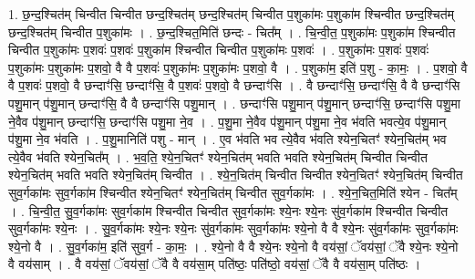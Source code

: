\documentclass[17pt]{extarticle}
\begin{document}
1. छ॒न्द॒श्चित॑म् चिन्वीत चिन्वीत छन्द॒श्चित॑म् छन्द॒श्चित॑म् चिन्वीत प॒शुका॑मः प॒शुका॑म श्चिन्वीत छन्द॒श्चित॑म् छन्द॒श्चित॑म् चिन्वीत प॒शुका॑मः । . छ॒न्द॒श्चित॒मिति॑ छन्दः - चित᳚म् । . चि॒न्वी॒त॒ प॒शुका॑मः प॒शुका॑म श्चिन्वीत चिन्वीत प॒शुका॑मः प॒शवः॑ प॒शवः॑ प॒शुका॑म श्चिन्वीत चिन्वीत प॒शुका॑मः प॒शवः॑ । . प॒शुका॑मः प॒शवः॑ प॒शवः॑ प॒शुका॑मः प॒शुका॑मः प॒शवो॒ वै वै प॒शवः॑ प॒शुका॑मः प॒शुका॑मः प॒शवो॒ वै । . प॒शुका॑म॒ इति॑ प॒शु - का॒मः॒ । . प॒शवो॒ वै वै प॒शवः॑ प॒शवो॒ वै छन्दाꣳ॑सि॒ छन्दाꣳ॑सि॒ वै प॒शवः॑ प॒शवो॒ वै छन्दाꣳ॑सि । . वै छन्दाꣳ॑सि॒ छन्दाꣳ॑सि॒ वै वै छन्दाꣳ॑सि पशु॒मान् प॑शु॒मान् छन्दाꣳ॑सि॒ वै वै छन्दाꣳ॑सि पशु॒मान् । . छन्दाꣳ॑सि पशु॒मान् प॑शु॒मान् छन्दाꣳ॑सि॒ छन्दाꣳ॑सि पशु॒मा ने॒वैव प॑शु॒मान् छन्दाꣳ॑सि॒ छन्दाꣳ॑सि पशु॒मा ने॒व । . प॒शु॒मा ने॒वैव प॑शु॒मान् प॑शु॒मा ने॒व भ॑वति भवत्ये॒व प॑शु॒मान् प॑शु॒मा ने॒व भ॑वति । . प॒शु॒मानिति॑ पशु - मान् । . ए॒व भ॑वति भव त्ये॒वैव भ॑वति श्येन॒चितꣳ॑ श्येन॒चित॑म् भव त्ये॒वैव भ॑वति श्येन॒चित᳚म् । . भ॒व॒ति॒ श्ये॒न॒चितꣳ॑ श्येन॒चित॑म् भवति भवति श्येन॒चित॑म् चिन्वीत चिन्वीत श्येन॒चित॑म् भवति भवति श्येन॒चित॑म् चिन्वीत । . श्ये॒न॒चित॑म् चिन्वीत चिन्वीत श्येन॒चितꣳ॑ श्येन॒चित॑म् चिन्वीत सुव॒र्गका॑मः सुव॒र्गका॑म श्चिन्वीत श्येन॒चितꣳ॑ श्येन॒चित॑म् चिन्वीत सुव॒र्गका॑मः । . श्ये॒न॒चित॒मिति॑ श्येन - चित᳚म् । . चि॒न्वी॒त॒ सु॒व॒र्गका॑मः सुव॒र्गका॑म श्चिन्वीत चिन्वीत सुव॒र्गका॑मः श्ये॒नः श्ये॒नः सु॑व॒र्गका॑म श्चिन्वीत चिन्वीत सुव॒र्गका॑मः श्ये॒नः । . सु॒व॒र्गका॑मः श्ये॒नः श्ये॒नः सु॑व॒र्गका॑मः सुव॒र्गका॑मः श्ये॒नो वै वै श्ये॒नः सु॑व॒र्गका॑मः सुव॒र्गका॑मः श्ये॒नो वै । . सु॒व॒र्गका॑म॒ इति॑ सुव॒र्ग - का॒मः॒ । . श्ये॒नो वै वै श्ये॒नः श्ये॒नो वै वय॑सां॒ ॅवय॑सां॒ ॅवै श्ये॒नः श्ये॒नो वै वय॑साम् । . वै वय॑सां॒ ॅवय॑सां॒ ॅवै वै वय॑सा॒म् पति॑ष्ठः॒ पति॑ष्ठो॒ वय॑सां॒ ॅवै वै वय॑सा॒म् पति॑ष्ठः । \newline
\end{document}
